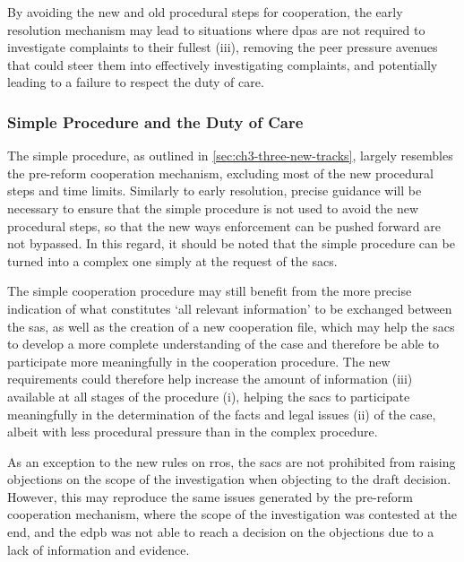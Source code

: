 By avoiding the new and old procedural steps for cooperation, the early resolution mechanism may lead to situations where \glspl{dpa} are not required to investigate complaints to their fullest (iii), removing the peer pressure avenues that could steer them into effectively investigating complaints,\autocite[466]{mastenbroekFillingGapEuropean2018} and potentially leading to a failure to respect the duty of care.

\subsubsection{Simple Procedure and the Duty of Care}
\label{sec:ch4-simple-procedure}

The simple procedure, as outlined in \cref{sec:ch3-three-new-tracks}, largely resembles the pre-reform cooperation mechanism, excluding most of the new procedural steps and time limits.\autocite[6(1)]{ProceduralRegulation}
Similarly to early resolution, precise guidance will be necessary to ensure that the simple procedure is not used to avoid the new procedural steps, so that the new ways enforcement can be pushed forward are not bypassed. 
In this regard, it should be noted that the simple procedure can be turned into a complex one simply at the request of the \glspl{sac}.\autocite[6(3)]{ProceduralRegulation}

The simple cooperation procedure may still benefit from the more precise indication of what constitutes `all relevant information' to be exchanged between the \glspl{sa},\autocite[9]{ProceduralRegulation} as well as the creation of a new cooperation file,\autocite[26]{ProceduralRegulation} which may help the \glspl{sac} to develop a more complete understanding of the case and therefore be able to participate more meaningfully in the cooperation procedure.
The new requirements could therefore help increase the amount of information (iii) available at all stages of the procedure (i), helping the \glspl{sac} to participate meaningfully in the determination of the facts and legal issues (ii) of the case, albeit with less procedural pressure than in the complex procedure.

As an exception to the new rules on \glspl{rro}, the \glspl{sac} are not prohibited from raising objections on the scope of the investigation when objecting to the draft decision.
However, this may reproduce the same issues generated by the pre-reform cooperation mechanism, where the scope of the investigation was contested at the end, and the \gls{edpb} was not able to reach a decision on the objections due to a lack of information and evidence.

